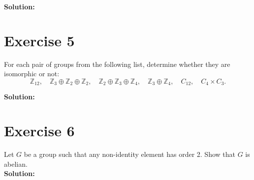 \documentclass{article}
\begin{document}
\textbf{Solution:} \\



\newpage

\section*{Exercise 5}
For each pair of groups from the following list, determine whether they are isomorphic or not:
\[ \mathbb{Z}_{12}, \quad \mathbb{Z}_3 \oplus \mathbb{Z}_2 \oplus \mathbb{Z}_2, \quad \mathbb{Z}_2 \oplus \mathbb{Z}_3 \oplus \mathbb{Z}_4, \quad \mathbb{Z}_3 \oplus \mathbb{Z}_4, \quad C_{12}, \quad C_4 \times C_3. \]

\textbf{Solution:} \\



\newpage

\section*{Exercise 6}
Let $G$ be a group such that any non-identity element has order 2. Show that $G$ is abelian. \\

\textbf{Solution:} \\
\end{document}
